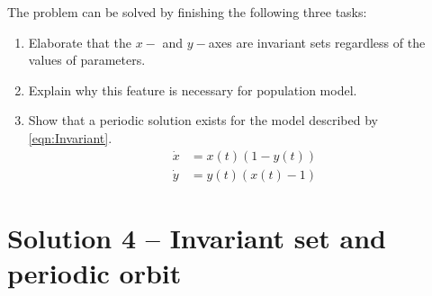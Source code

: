 \documentclass[a4paper,twocolumn]{article} %
\begin{document}
The problem can be solved by finishing the following three tasks:
\begin{enumerate}
  \item Elaborate that the $x-$ and $y-$axes are invariant sets regardless of the values of parameters.
  \item Explain why this feature is necessary for population model.
  \item Show that a periodic solution exists for the model described by \eqref{eqn:Invariant}.
  \begin{subequations}\label{eqn:Invariant}
\begin{align} 
\dot{x}&=x(t)(1-y(t))\label{eqn:Invariant1}\\
\dot{y}&=y(t)(x(t)-1)\label{eqn:Invariant2}
\end{align}
\end{subequations}
\end{enumerate}

\section*{Solution 4 -- Invariant set and periodic orbit}
\label{sec:sol4}
\end{document}
